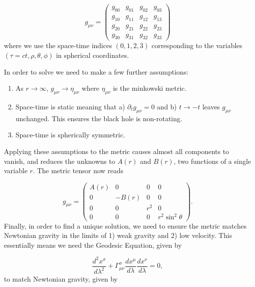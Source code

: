 \documentclass{CUP-JNL-DTM}%
\theoremstyle{definition}
\numberwithin{equation}{section}
\begin{document}
\begin{equation}
    g_{\mu\nu} = \begin{pmatrix}
        g_{00} & g_{01} & g_{02} & g_{03} \\
        g_{10} & g_{11} & g_{12} & g_{13} \\
        g_{20} & g_{21} & g_{22} & g_{23} \\
        g_{30} & g_{31} & g_{32} & g_{33}
    \end{pmatrix}
\end{equation}
where we use the space-time indices $(0,1,2,3)$ corresponding to the variables $(\tau=ct, \rho, \theta, \phi)$ in spherical coordinates. 

In order to solve we need to make a few further assumptions:

\begin{enumerate}
    \item As $r \rightarrow \infty$, $g_{\mu\nu} \rightarrow \eta_{\mu\nu}$ where $\eta_{\mu\nu}$ is the minkowski metric. 
    \item Space-time is static meaning that a) $\partial_t g_{\mu\nu} = 0$ and b) $t \rightarrow -t$ leaves $g_{\mu\nu}$ unchanged. This ensures the black hole is non-rotating. 
    \item Space-time is spherically symmetric. 
\end{enumerate}
Applying these assumptions to the metric causes almost all components to vanish, and reduces the unknowns to $A(r)$ and $B(r)$, two functions of a single variable $r$. The metric tensor now reads 

\begin{equation}
    g_{\mu\nu} = \begin{pmatrix}
        A(r) & 0 & 0 & 0 \\
        0 & -B(r) & 0 & 0 \\
        0 & 0 & r^2 & 0 \\
        0 & 0 & 0 & r^2\sin^2\theta
    \end{pmatrix}.
    \label{eqn:g_simple}
\end{equation}
Finally, in order to find a unique solution, we need to ensure the metric matches Newtonian gravity in the limits of 1) weak gravity and 2) low velocity. This essentially means we need the Geodesic Equation, given by 

\begin{equation}
    \frac{d^2 x^{\sigma}}{d\lambda^2} + \Gamma^{\sigma}_{\mu\nu} \frac{dx^{\mu}}{d\lambda}\frac{dx^{\nu}}{d\lambda} = 0,
    \label{eqn:geo}
\end{equation}
to match Newtonian gravity, given by 
\end{document}

